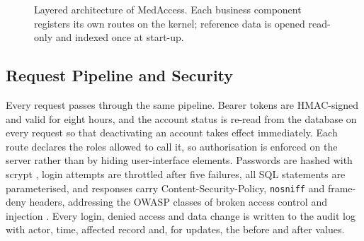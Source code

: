 \documentclass[conference]{IEEEtran}
\begin{document}
\begin{figure}[!t]
{%
}
\caption{Layered architecture of MedAccess. Each business component registers its own routes on the kernel; reference data is opened read-only and indexed once at start-up.}
\label{fig:arch}
\end{figure}

\subsection{Request Pipeline and Security}
Every request passes through the same pipeline. Bearer tokens are HMAC-signed \cite{rfc2104} and valid for eight hours, and the account status is re-read from the database on every request so that deactivating an account takes effect immediately. Each route declares the roles allowed to call it, so authorisation is enforced on the server rather than by hiding user-interface elements. Passwords are hashed with scrypt \cite{percival2009}, login attempts are throttled after five failures, all SQL statements are parameterised, and responses carry Content-Security-Policy, \texttt{nosniff} and frame-deny headers, addressing the OWASP classes of broken access control and injection \cite{owasp2021}. Every login, denied access and data change is written to the audit log with actor, time, affected record and, for updates, the before and after values.
\end{document}
